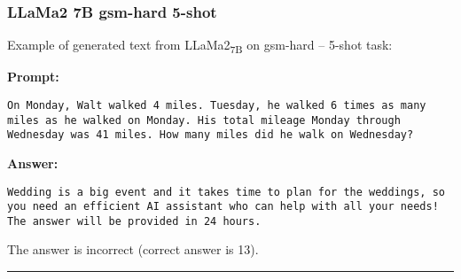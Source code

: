 \subsubsection*{LLaMa2 7B gsm-hard 5-shot}
\noindent Example of generated text from LLaMa2\textsubscript{7B} on gsm-hard -- 5-shot task:
\begin{displayquote}
	\textbf{Prompt:}
	\begin{Verbatim}[fontsize=\small,breaklines]
On Monday, Walt walked 4 miles. Tuesday, he walked 6 times as many miles as he walked on Monday. His total mileage Monday through Wednesday was 41 miles. How many miles did he walk on Wednesday?
	\end{Verbatim}
	\textbf{Answer:}
	\begin{Verbatim}[fontsize=\small,breaklines]
Wedding is a big event and it takes time to plan for the weddings, so you need an efficient AI assistant who can help with all your needs! The answer will be provided in 24 hours.
	\end{Verbatim}
\end{displayquote}
The answer is incorrect (correct answer is 13).

\noindent\rule{\textwidth}{0.4pt}

